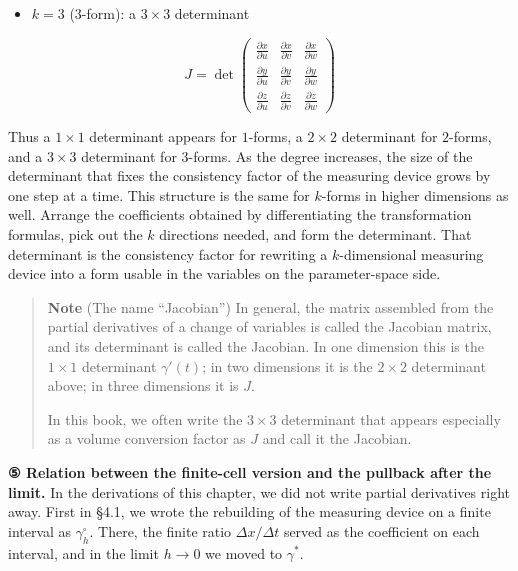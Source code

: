 \begin{itemize}
\tightlist
\item
  \(k=3\) (\(3\)-form): a \(3 \times 3\) determinant
\end{itemize}

\[
J
=
\det
\begin{pmatrix}
\frac{\partial x}{\partial u} & \frac{\partial x}{\partial v} & \frac{\partial x}{\partial w}\\[4pt]
\frac{\partial y}{\partial u} & \frac{\partial y}{\partial v} & \frac{\partial y}{\partial w}\\[4pt]
\frac{\partial z}{\partial u} & \frac{\partial z}{\partial v} & \frac{\partial z}{\partial w}
\end{pmatrix}
\]

Thus a \(1 \times 1\) determinant appears for \(1\)-forms, a
\(2 \times 2\) determinant for \(2\)-forms, and a \(3 \times 3\)
determinant for \(3\)-forms. As the degree increases, the size of the
determinant that fixes the consistency factor of the measuring device
grows by one step at a time. This structure is the same for \(k\)-forms
in higher dimensions as well. Arrange the coefficients obtained by
differentiating the transformation formulas, pick out the \(k\)
directions needed, and form the determinant. That determinant is the
consistency factor for rewriting a \(k\)-dimensional measuring device
into a form usable in the variables on the parameter-space side.

\begin{quote}
\textbf{Note} (The name ``Jacobian'') In general, the matrix assembled
from the partial derivatives of a change of variables is called the
Jacobian matrix, and its determinant is called the Jacobian. In one
dimension this is the \(1\times1\) determinant \(\gamma'(t)\); in two
dimensions it is the \(2\times2\) determinant above; in three dimensions
it is \(J\).

In this book, we often write the \(3\times3\) determinant that appears
especially as a volume conversion factor as \(J\) and call it the
Jacobian.
\end{quote}

\textbf{⑤ Relation between the finite-cell version and the pullback after the limit.}
In the derivations of this chapter, we did not write partial derivatives
right away. First in §4.1, we wrote the rebuilding of the measuring
device on a finite interval as \(\gamma_h^\square\). There, the finite
ratio \(\Delta x/\Delta t\) served as the coefficient on each interval,
and in the limit \(h\to0\) we moved to \(\gamma^*\).

